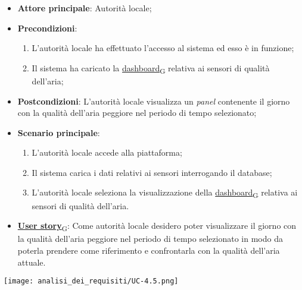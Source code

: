 \begin{itemize}
	\item \textbf{Attore principale}: Autorità locale;
	\item \textbf{Precondizioni}:
	      \begin{enumerate}
		      \item L'autorità locale ha effettuato l'accesso al sistema ed esso è in funzione;
		      \item Il sistema ha caricato la \href{https://7last.github.io/docs/rtb/documentazione-interna/glossario\#dashboard}{dashboard\textsubscript{G}} relativa ai sensori di qualità dell'aria;
	      \end{enumerate}
	\item \textbf{Postcondizioni}: L'autorità locale visualizza un \textit{panel} contenente il giorno con la qualità dell'aria peggiore nel periodo di tempo selezionato;
	\item \textbf{Scenario principale}:
	      \begin{enumerate}
		      \item L'autorità locale accede alla piattaforma;
		      \item Il sistema carica i dati relativi ai sensori interrogando il database;
		      \item L'autorità locale seleziona la visualizzazione della \href{https://7last.github.io/docs/rtb/documentazione-interna/glossario\#dashboard}{dashboard\textsubscript{G}} relativa ai sensori di qualità dell'aria.
	      \end{enumerate}
	\item \href{https://7last.github.io/docs/rtb/documentazione-interna/glossario\#user-story}{\textbf{User story}\textsubscript{G}}:
	      Come autorità locale desidero poter visualizzare il giorno con la qualità dell'aria peggiore nel periodo di tempo selezionato
	      in modo da poterla prendere come riferimento e confrontarla con la qualità dell'aria attuale.
\end{itemize}
\begin{center}
	\texttt{[image: analisi\_dei\_requisiti/UC-4.5.png]}
\end{center}

